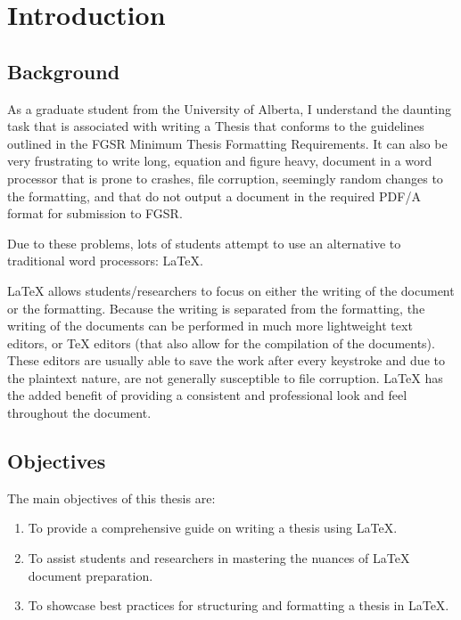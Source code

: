 \chapter{Introduction}\label{ch:Introduction}\section{Background}
	As a graduate student from the University of Alberta, I understand the daunting task that is associated with writing a Thesis that conforms to the guidelines outlined in the FGSR Minimum Thesis Formatting Requirements. 
	It can also be very frustrating to write long, equation and figure heavy, document in a word processor that is prone to crashes, file corruption, seemingly random changes to the formatting, and that do not output a document in the required PDF/A format for submission to FGSR.
	
	Due to these problems, lots of students attempt to use an alternative to traditional word processors: \LaTeX. 
	
	\LaTeX{} allows students/researchers to focus on either the writing of the document or the formatting. 
	Because the writing is separated from the formatting, the writing of the documents can be performed in much more lightweight text editors, or \TeX{} editors (that also allow for the compilation of the documents). 
	These editors are usually able to save the work after every keystroke and due to the plaintext nature, are not generally susceptible to file corruption.
	\LaTeX{} has the added benefit of providing a consistent and professional look and feel throughout the document. 

	\section{Objectives}
		The main objectives of this thesis are:
		\begin{enumerate}
			\item To provide a comprehensive guide on writing a thesis using \LaTeX{}.
			\item To assist students and researchers in mastering the nuances of \LaTeX{} document preparation.
			\item To showcase best practices for structuring and formatting a thesis in \LaTeX{}.
		\end{enumerate}


